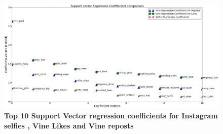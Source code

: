 \begin{figure}
\centering
\includegraphics[width=\columnwidth]{plots/regression_coeff}
\caption{\textbf{ Top 10  Support Vector regression coefficients for Instagram selfies , Vine Likes and Vine reposts}}
\label{fig:Like_Repost_CDF}
\end{figure}
